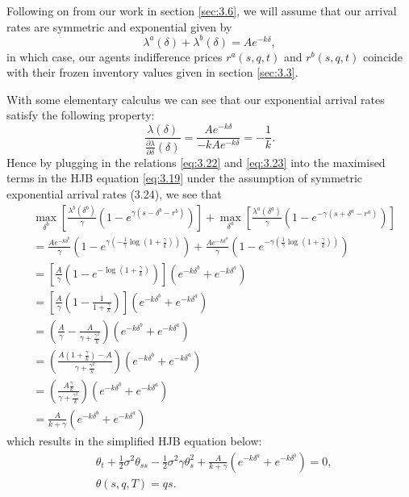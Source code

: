 Following on from our work in section \ref{sec:3.6}, we will assume that our arrival 
rates are symmetric and exponential given by 
\begin{equation}\label{eq:3.24}
    \lambda^a(\delta)+\lambda^b(\delta)=Ae^{-k\delta},
\end{equation}
in which case, our agents indifference prices $r^a(s,q,t)$ and $r^b(s,q,t)$
coincide with their frozen inventory values given in section \ref{sec:3.3}.

With some elementary calculus we can see that our exponential arrival rates satisfy
the following property:
\begin{equation*}
    \frac{\lambda(\delta)}{\frac{\partial\lambda}{\partial\delta}(\delta)}=\frac{Ae^{-k\delta}}{-kAe^{-k\delta}}=-\frac{1}{k}.
\end{equation*}
Hence by plugging in the relations \eqref{eq:3.22} and \eqref{eq:3.23} into the 
maximised terms in the HJB equation \eqref{eq:3.19} under the assumption of symmetric
exponential arrival rates (3.24), we see that
\begin{align*}
    &\max\limits_{\delta^b}\left[\frac{\lambda^b(\delta^b)}{\gamma}(1-e^{\gamma(s-\delta^b-r^b)})\right]+\max\limits_{\delta^a}\left[\frac{\lambda^a(\delta^a)}{\gamma}(1-e^{-\gamma(s+\delta^a-r^a)})\right]\\
    &=\frac{Ae^{-k\delta^b}}{\gamma}\left(1-e^{\gamma\left(-\frac{1}{\gamma}\log\left(1+\frac{\gamma}{k}\right)\right)}\right)+\frac{Ae^{-k\delta^a}}{\gamma}\left(1-e^{-\gamma\left(\frac{1}{\gamma}\log\left(1+\frac{\gamma}{k}\right)\right)}\right)\\
    &=\left[\frac{A}{\gamma}\left(1-e^{-\log\left(1+\frac{\gamma}{k}\right)}\right)\right](e^{-k\delta^b}+e^{-k\delta^a})\\
    &=\left[\frac{A}{\gamma}\left(1-\frac{1}{1+\frac{\gamma}{k}}\right)\right](e^{-k\delta^b}+e^{-k\delta^a})\\
    &=\left(\frac{A}{\gamma}-\frac{A}{\gamma+\frac{\gamma^2}{k}}\right)(e^{-k\delta^b}+e^{-k\delta^a})\\
    &=\left(\frac{A\left(1+\frac{\gamma}{k}\right)-A}{\gamma+\frac{\gamma^2}{k}}\right)(e^{-k\delta^b}+e^{-k\delta^a})\\
    &=\left(\frac{A\frac{\gamma}{k}}{\gamma+\frac{\gamma^2}{k}}\right)(e^{-k\delta^b}+e^{-k\delta^a})\\
    &=\frac{A}{k+\gamma}(e^{-k\delta^b}+e^{-k\delta^a})
\end{align*}
which results in the simplified HJB equation below:
\begin{equation}\label{eq:simp-hjb}
    \begin{aligned} 
        &\theta_t+\frac{1}{2}\sigma^2\theta_{ss}-\frac{1}{2}\sigma^2\gamma\theta^2_s+\frac{A}{k+\gamma}(e^{-k\delta^a}+e^{-k\delta^b})=0,\\
        &\theta(s,q,T)=qs.
    \end{aligned}
\end{equation}

